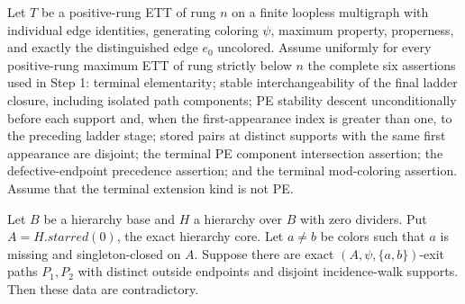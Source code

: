 \begin{helper}
Let $T$ be a positive-rung ETT of rung $n$ on a finite loopless
multigraph with individual edge identities, generating coloring $\psi$,
maximum property, properness, and exactly the distinguished edge $e_0$
uncolored.  Assume uniformly for every positive-rung maximum ETT of rung
strictly below $n$ the complete six assertions used in Step 1:
terminal elementarity; stable interchangeability of the final ladder
closure, including isolated path components; PE stability descent unconditionally before each support and, when the
first-appearance index is greater than one, to the preceding ladder stage;
stored pairs at distinct supports with the same first appearance are disjoint; the terminal PE component intersection assertion; the
defective-endpoint precedence assertion; and the terminal mod-coloring
assertion.  Assume that the terminal extension kind is not PE.

Let $B$ be a hierarchy base and $H$ a hierarchy over $B$ with zero
dividers.  Put $A=H.\mathit{starred}(0)$, the exact hierarchy core.  Let
$a\ne b$ be colors such that $a$ is missing and singleton-closed on $A$.
Suppose there are exact $(A,\psi,\{a,b\})$-exit paths $P_1,P_2$ with
distinct outside endpoints and disjoint incidence-walk supports.  Then
these data are contradictory.
\end{helper}
